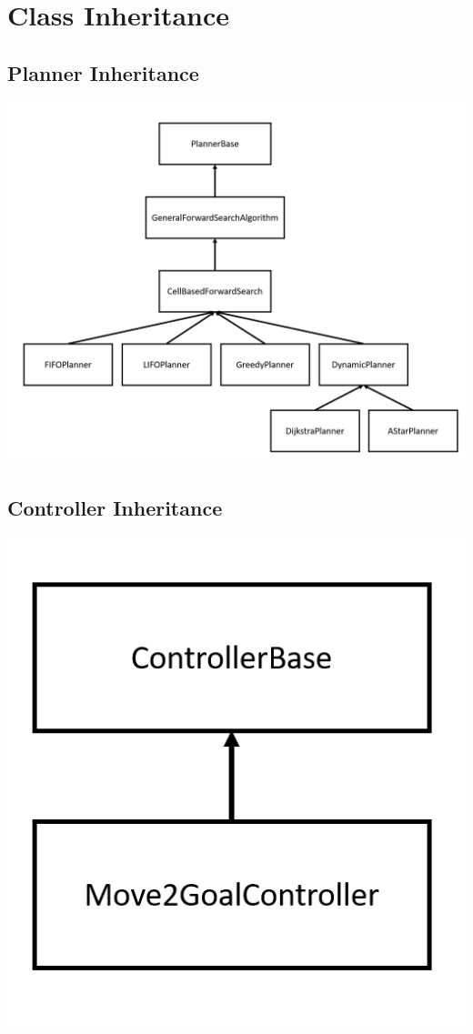 \documentclass[a4paper,12pt]{article}
\begin{document}
	
	\newpage
	
	\appendix
	\appendixpage
	\addappheadtotoc
	\section{Class Inheritance}
	\subsection{Planner Inheritance}
	\label{appendix:planner}
	\includegraphics[scale=0.6]{images/planner_inheritance.png}
	\subsection{Controller Inheritance}
	\label{appendix:controller}
	\includegraphics[scale=0.6]{images/controller_inheritance.png}
\end{document}
